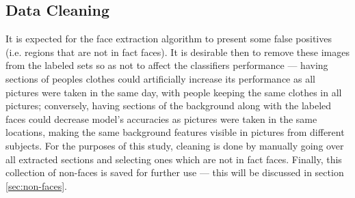 \documentclass[11pt]{article}
\begin{document}
        \subsection{Data Cleaning}
            It is expected for the face extraction algorithm to present some false positives (i.e. regions that are not in fact faces). It is desirable then to remove these images from the labeled sets so as not to affect the classifiers performance --- having sections of peoples clothes could artificially increase its performance as all pictures were taken in the same day, with people keeping the same clothes in all pictures; conversely, having sections of the background along with the labeled faces could decrease model's accuracies as pictures were taken in the same locations, making the same background features visible in pictures from different subjects. For the purposes of this study, cleaning is done by manually going over all extracted sections and selecting ones which are not in fact faces. Finally, this collection of non-faces is saved for further use --- this will be discussed in section \ref{sec:non-faces}.
\end{document}
